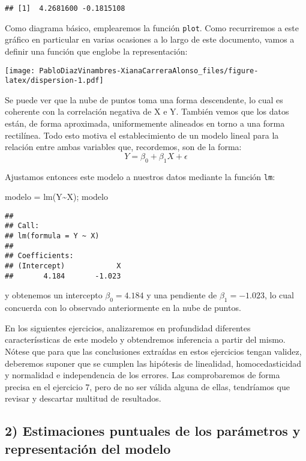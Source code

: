 \documentclass[
]{article}
\newenvironment{Shaded}{\begin{snugshade}}{\end{snugshade}}
\newcommand{\FunctionTok}[1]{\textcolor[rgb]{0.00,0.00,0.00}{#1}}
\newcommand{\NormalTok}[1]{#1}
\newcommand{\OtherTok}[1]{\textcolor[rgb]{0.56,0.35,0.01}{#1}}
\newcommand{\SpecialCharTok}[1]{\textcolor[rgb]{0.00,0.00,0.00}{#1}}
\begin{document}
\begin{verbatim}
## [1]  4.2681600 -0.1815108
\end{verbatim}

Como diagrama básico, emplearemos la función \texttt{plot}. Como
recurriremos a este gráfico en particular en varias ocasiones a lo largo
de este documento, vamos a definir una función que englobe la
representación:

\texttt{[image: PabloDiazVinambres-XianaCarreraAlonso\_files/figure-latex/dispersion-1.pdf]}

Se puede ver que la nube de puntos toma una forma descendente, lo cual
es coherente con la correlación negativa de X e Y. También vemos que los
datos están, de forma aproximada, uniformemente alineados en torno a una
forma rectilínea. Todo esto motiva el establecimiento de un modelo
lineal para la relación entre ambas variables que, recordemos, son de la
forma: \[
Y = \beta_0 + \beta_1X + \epsilon
\]

Ajustamos entonces este modelo a nuestros datos mediante la función
\texttt{lm}:

\begin{Shaded}
\begin{Highlighting}[]
\NormalTok{modelo }\OtherTok{=} \FunctionTok{lm}\NormalTok{(Y}\SpecialCharTok{\textasciitilde{}}\NormalTok{X); modelo}
\end{Highlighting}
\end{Shaded}

\begin{verbatim}
## 
## Call:
## lm(formula = Y ~ X)
## 
## Coefficients:
## (Intercept)            X  
##       4.184       -1.023
\end{verbatim}

y obtenemos un intercepto \(\beta_0 = 4.184\) y una pendiente de
\(\beta_1 = -1.023\), lo cual concuerda con lo observado anteriormente
en la nube de puntos.

En los siguientes ejercicios, analizaremos en profundidad diferentes
caracteríssticas de este modelo y obtendremos inferencia a partir del
mismo. Nótese que para que las conclusiones extraídas en estos
ejercicios tengan validez, deberemos suponer que se cumplen las
hipótesis de linealidad, homocedasticidad y normalidad e independencia
de los errores. Las comprobaremos de forma precisa en el ejercicio 7,
pero de no ser válida alguna de ellas, tendríamos que revisar y
descartar multitud de resultados.

\hypertarget{estimaciones-puntuales-de-los-paruxe1metros-y-representaciuxf3n-del-modelo}{%
\subsection{2) Estimaciones puntuales de los parámetros y representación
del
modelo}\label{estimaciones-puntuales-de-los-paruxe1metros-y-representaciuxf3n-del-modelo}}
\end{document}

